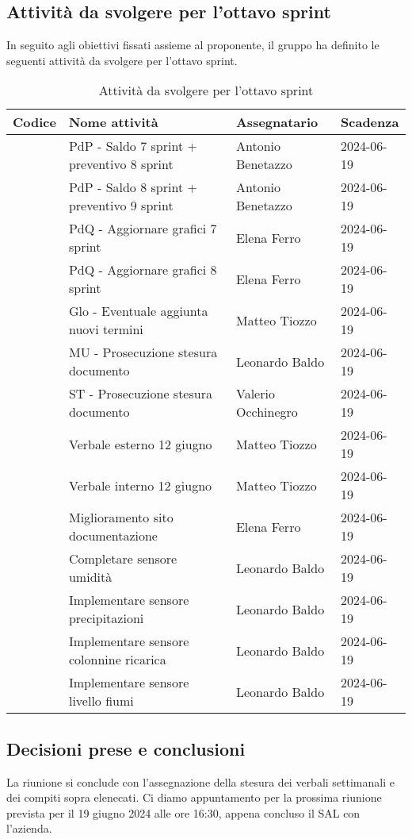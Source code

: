 \documentclass[italian,12pt]{article}
\begin{document}
\newpage

\subsection{Attività da svolgere per l'ottavo sprint}
In seguito agli obiettivi fissati assieme al proponente, il gruppo ha definito le seguenti attività da svolgere per l'ottavo sprint.

\begin{table}[!h]
	\centering
	\begin{tabular}{ |l||p{7cm}|l|l| }
		\hline
		\textbf{Codice}    & \textbf{Nome attività}                     & \textbf{Assegnatario} & \textbf{Scadenza} \\
		\hline
		\mySkip[86bz7hfxp] & PdP - Saldo 7 sprint + preventivo 8 sprint & Antonio Benetazzo     & 2024-06-19 \\
		\mySkip[86bz8e6c7] & PdP - Saldo 8 sprint + preventivo 9 sprint & Antonio Benetazzo     & 2024-06-19 \\
		\mySkip[86bz7hfyc] & PdQ - Aggiornare grafici 7 sprint          & Elena Ferro           & 2024-06-19 \\
		\mySkip[86bz8e48h] & PdQ - Aggiornare grafici 8 sprint          & Elena Ferro           & 2024-06-19 \\
		\mySkip[86bz8e8fx] & Glo - Eventuale aggiunta nuovi termini     & Matteo Tiozzo         & 2024-06-19 \\
		\mySkip[86bz7hg4z] & MU - Prosecuzione stesura documento        & Leonardo Baldo        & 2024-06-19 \\
		\mySkip[86bz7hg4d] & ST - Prosecuzione stesura documento        & Valerio Occhinegro    & 2024-06-19 \\
		\mySkip[86bz7hftu] & Verbale esterno 12 giugno                  & Matteo Tiozzo         & 2024-06-19 \\
		\mySkip[86bz7hfu3] & Verbale interno 12 giugno                  & Matteo Tiozzo         & 2024-06-19 \\
		\mySkip[86bz8dwn3] & Miglioramento sito documentazione          & Elena Ferro           & 2024-06-19 \\
		\mySkip[86bz7hfte] & Completare sensore umidità                 & Leonardo Baldo        & 2024-06-19 \\
		\mySkip[86bz8dufz] & Implementare sensore precipitazioni        & Leonardo Baldo        & 2024-06-19 \\
		\mySkip[86bz8duk3] & Implementare sensore colonnine ricarica    & Leonardo Baldo        & 2024-06-19 \\
		\mySkip[86bz8dwdy] & Implementare sensore livello fiumi         & Leonardo Baldo        & 2024-06-19 \\
		\hline
	\end{tabular}
	\caption{Attività da svolgere per l'ottavo sprint}
\end{table}

\subsection{Decisioni prese e conclusioni}
La riunione si conclude con l'assegnazione della stesura dei verbali settimanali e dei compiti sopra elenecati. Ci diamo appuntamento per la prossima riunione prevista per il 19 giugno 2024 alle ore 16:30, appena concluso il SAL con l'azienda.
\end{document}
